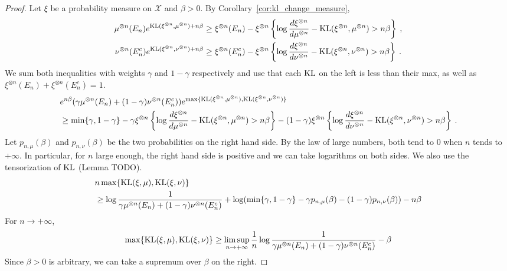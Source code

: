 \begin{proof}
Let $\xi$ be a probability measure on $\mathcal X$ and $\beta > 0$. By Corollary~\ref{cor:kl_change_measure},
\begin{align*}
\mu^{\otimes n}(E_n) e^{\operatorname{KL}(\xi^{\otimes n}, \mu^{\otimes n}) + n\beta}
&\ge \xi^{\otimes n}(E_n) - \xi^{\otimes n}\left\{ \log\frac{d \xi^{\otimes n}}{d \mu^{\otimes n}} - \operatorname{KL}(\xi^{\otimes n}, \mu^{\otimes n}) > n\beta \right\}
\: , \\
\nu^{\otimes n}(E_n^c) e^{\operatorname{KL}(\xi^{\otimes n}, \nu^{\otimes n}) + n\beta}
&\ge \xi^{\otimes n}(E_n^c) - \xi^{\otimes n}\left\{ \log\frac{d \xi^{\otimes n}}{d \nu^{\otimes n}} - \operatorname{KL}(\xi^{\otimes n}, \nu^{\otimes n}) > n\beta \right\}
\: .
\end{align*}
We sum both inequalities with weights $\gamma$ and $1-\gamma$ respectively and use that each $\operatorname{KL}$ on the left is less than their max, as well as $\xi^{\otimes n}(E_n) + \xi^{\otimes n}(E_n^c) = 1$.
\begin{align*}
&e^{n\beta} (\gamma\mu^{\otimes n}(E_n) + (1-\gamma)\nu^{\otimes n}(E_n^c)) e^{\max\{\operatorname{KL}(\xi^{\otimes n}, \mu^{\otimes n}), \operatorname{KL}(\xi^{\otimes n}, \nu^{\otimes n})\}}
\\
&\ge \min\{\gamma, 1-\gamma\} - \gamma\xi^{\otimes n}\left\{ \log\frac{d \xi^{\otimes n}}{d \mu^{\otimes n}} - \operatorname{KL}(\xi^{\otimes n}, \mu^{\otimes n}) > n\beta \right\}
  - (1 - \gamma)\xi^{\otimes n}\left\{ \log\frac{d \xi^{\otimes n}}{d \nu^{\otimes n}} - \operatorname{KL}(\xi^{\otimes n}, \nu^{\otimes n}) > n\beta \right\}
\: .
\end{align*}
Let $p_{n,\mu}(\beta)$ and $p_{n, \nu}(\beta)$ be the two probabilities on the right hand side. By the law of large numbers, both tend to 0 when $n$ tends to $+\infty$.
In particular, for $n$ large enough, the right hand side is positive and we can take logarithms on both sides. We also use the tensorization of $\operatorname{KL}$ (Lemma TODO).
\begin{align*}
& n \max\{\operatorname{KL}(\xi, \mu), \operatorname{KL}(\xi, \nu)\}
\\
&\ge \log \frac{1}{\gamma \mu^{\otimes n}(E_n) + (1 - \gamma)\nu^{\otimes n}(E_n^c)} + \log (\min\{\gamma, 1-\gamma\} - \gamma p_{n, \mu}(\beta) - (1 - \gamma) p_{n, \nu}(\beta)) - n\beta
\end{align*}
For $n \to +\infty$,
\begin{align*}
\max\{\operatorname{KL}(\xi, \mu), \operatorname{KL}(\xi, \nu)\}
\ge \limsup_{n \to + \infty}\frac{1}{n}\log \frac{1}{\gamma \mu^{\otimes n}(E_n) + (1 - \gamma)\nu^{\otimes n}(E_n^c)} - \beta
\end{align*}
Since $\beta > 0$ is arbitrary, we can take a supremum over $\beta$ on the right.


\end{proof}
